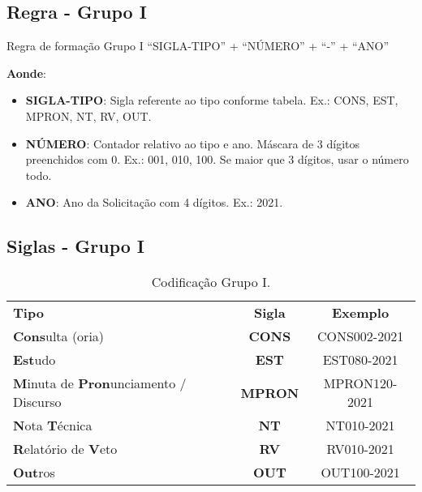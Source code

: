 \subsection{Regra - Grupo I}

\begin{env-regra}{Regra de formação Grupo I}
	``SIGLA-TIPO'' + ``NÚMERO'' + ``-'' + ``ANO''
\end{env-regra}

\textbf{Aonde}:
\begin{itemize}
	\item \textbf{SIGLA-TIPO}: Sigla referente ao tipo conforme tabela. Ex.: CONS, EST, MPRON, NT, RV, OUT.
	\item \textbf{NÚMERO}: Contador relativo ao tipo e ano. Máscara de 3 dígitos preenchidos com 0. Ex.: 001, 010, 100. Se maior que 3 dígitos, usar o número todo.
	\item \textbf{ANO}: Ano da Solicitação com 4 dígitos. Ex.: 2021.
\end{itemize}

\subsection{Siglas - Grupo I}

\begin{table}[!h]
	\begin{center}
		\begin{tabular}{|p{}|c|c|}
			\hline
			\rowcolor{lightgray!50} \multicolumn{3}{|c|}{\Large Siglas e Exemplos - Grupo I \normalsize} \\ \hline \hline
			\rowcolor{lightgray}\textbf{Tipo} & \textbf{Sigla} & \textbf{Exemplo} \\ \hline
			\rowcolor{corCOULD!10} \textbf{Cons}ulta (oria) & \textbf{CONS} & CONS002-2021  \\ \hline
			\rowcolor{corCOULD!20} \textbf{Est}udo & \textbf{EST} & EST080-2021 \\ \hline
			\rowcolor{corCOULD!10} \textbf{M}inuta de \textbf{Pron}unciamento / Discurso & \textbf{MPRON} & MPRON120-2021 \\ \hline
			\rowcolor{corCOULD!20} \textbf{N}ota \textbf{T}écnica  & \textbf{NT} & NT010-2021 \\ \hline
			\rowcolor{corCOULD!10} \textbf{R}elatório de \textbf{V}eto  & \textbf{RV} & RV010-2021 \\ \hline
			\rowcolor{corCOULD!20} \textbf{Out}ros & \textbf{OUT} & OUT100-2021 \\ \hline
		\end{tabular}    
		\caption{\label{tab:cod:grupoi} Codificação Grupo I.}
	\end{center}
\end{table}

